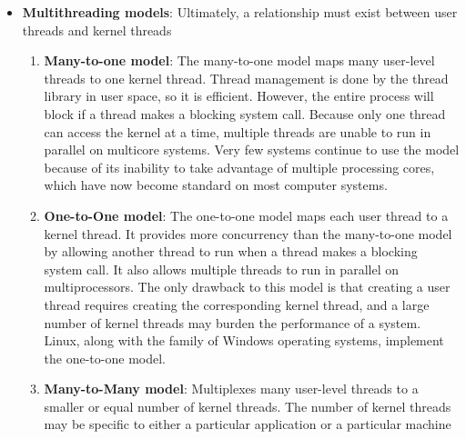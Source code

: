 \documentclass{report}
\begin{document}
\begin{itemize}
            \begin{enumerate}
                \item \textbf{Data parallelism} focuses on distributing subsets of the same data across multiple computing cores and performing the same operation on each core
                \item \textbf{Task parallelism} involves distributing not data but tasks (threads) across multiple computing cores. Each thread is performing a unique operation. Different threads may be operating on the same data, or they may be operating on different data.  
            \end{enumerate}
            However, data and task parallelism are not mutually exclusive, and an application may in fact use a hybrid of these two strategies.
        \item \textbf{Multithreading models}: Ultimately, a relationship must exist between user threads and kernel threads
            \begin{enumerate}
                \item \textbf{Many-to-one model}: The many-to-one model maps many user-level threads to one kernel thread. Thread management is done by the thread library in user space, so it is efficient. However, the entire process will block if a thread makes a blocking system call. 
                    \bigbreak \noindent 
                    Because only one thread can access the kernel at a time, multiple threads are unable to run in parallel on multicore systems.
                    \bigbreak \noindent 
                    Very few systems continue to use the model because of its inability to take advantage of multiple processing cores, which have now become standard on most computer systems.
                \item \textbf{One-to-One model}: The one-to-one model  maps each user thread to a kernel thread.  It provides more concurrency than the many-to-one model by allowing another thread to run when a thread makes a blocking system call. It also allows multiple threads to run in parallel on multiprocessors. The only drawback to this model is that creating a user thread requires creating the corresponding kernel thread, and a large number of kernel threads may burden the performance of a system. Linux, along with the family of Windows operating systems, implement the one-to-one model.
                \item \textbf{Many-to-Many model}:  Multiplexes many user-level threads to a smaller or equal number of kernel threads. The number of kernel threads may be specific to either a particular application or a particular machine


\end{enumerate}
\end{itemize}
\end{document}
